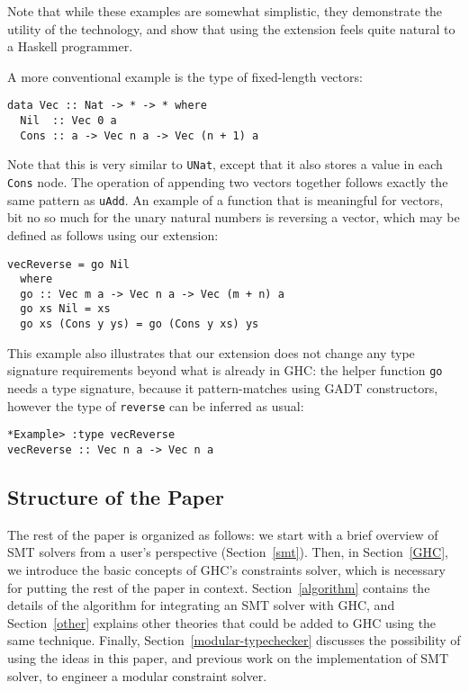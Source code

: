 \documentclass{sigplanconf}
\begin{document}
Note that while these examples are somewhat simplistic,
they demonstrate the utility of the technology, and show that using
the extension feels quite natural to a Haskell programmer.

A more conventional example is the type of fixed-length vectors:
\begin{Verbatim}
data Vec :: Nat -> * -> * where
  Nil  :: Vec 0 a
  Cons :: a -> Vec n a -> Vec (n + 1) a
\end{Verbatim}
Note that this is very similar to \Verb"UNat", except that it also
stores a value in each \Verb"Cons" node.  The operation of appending
two vectors together follows exactly the same pattern as \Verb"uAdd".
An example of a function that is meaningful for vectors, bit no
so much for the unary natural numbers is reversing a vector, which
may be defined as follows using our extension:
\begin{Verbatim}
vecReverse = go Nil
  where
  go :: Vec m a -> Vec n a -> Vec (m + n) a
  go xs Nil = xs
  go xs (Cons y ys) = go (Cons y xs) ys
\end{Verbatim}
This example also illustrates that our extension does not change any type
signature requirements beyond what is already in GHC: the helper
function \Verb"go" needs a type signature, because it pattern-matches
using GADT constructors, however the type of \Verb"reverse" can be
inferred as usual:
\begin{Verbatim}
*Example> :type vecReverse
vecReverse :: Vec n a -> Vec n a
\end{Verbatim}




\subsection{Structure of the Paper}

The rest of the paper is organized as follows:
we start with a brief overview of SMT solvers from a user's perspective
(Section~\ref{smt}).  Then, in Section~\ref{GHC}, we introduce the
basic concepts of GHC's constraints
solver, which is necessary for putting the rest of the paper in context.
Section~\ref{algorithm} contains the details of the algorithm for
integrating an SMT solver with GHC, and Section~\ref{other} explains
other theories that could be added to GHC using the same technique.
Finally, Section~\ref{modular-typechecker} discusses the possibility
of using the ideas in this paper, and previous work on the
implementation of SMT solver, to engineer a modular constraint solver.
\end{document}
